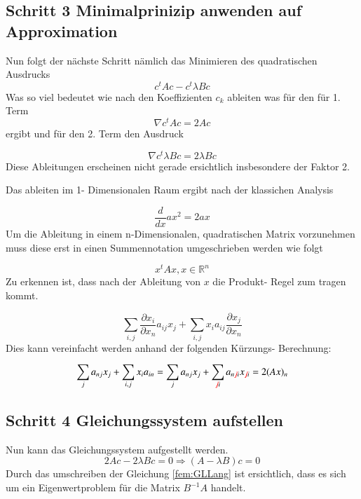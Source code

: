 \subsection{Schritt 3 Minimalprinizip anwenden auf Approximation}

Nun folgt der nächste Schritt nämlich das Minimieren des quadratischen Ausdrucks
\begin{equation}
	c^t Ac - c^t \lambda Bc
\end{equation}
Was so viel bedeutet wie nach den Koeffizienten $c_k$ ableiten was für den  für 1. Term
\begin{equation}
	\nabla c^t Ac = 2Ac
\end{equation}
ergibt und für den 2. Term den Ausdruck

\begin{equation}
	\nabla c^t \lambda Bc = 2\lambda Bc
\end{equation}
Diese Ableitungen erscheinen nicht gerade ersichtlich insbesondere der Faktor 2. 

Das ableiten im 1- Dimensionalen Raum ergibt nach der klassichen Analysis

\begin{equation}
	\frac{d}{dx} ax^2 = 2ax
\end{equation}
Um die Ableitung in einem n-Dimensionalen, quadratischen Matrix vorzunehmen muss diese erst in einen Summennotation umgeschrieben werden wie folgt

\begin{equation}
			x^tAx, x \in \mathbb{R}^n
\end{equation}
Zu erkennen ist, dass nach der Ableitung von $x$ die Produkt- Regel zum tragen kommt. 

\begin{equation}
	\sum_{i,j} \frac{\partial x_i}{\partial x_n} a_{ij} x_j + \sum_{i,j} x_i a_{ij} \frac{\partial x_j}{\partial x_n}
\end{equation}
Dies kann vereinfacht werden anhand der folgenden Kürzungs- Berechnung:

\begin{equation}
	\sum_{j} a_{nj} x_j + \sum_{i,j} x_i a_{in} = \sum_{j} a_{nj} x_j + \sum_{\textcolor{red}{\not{j}} i} a_{n \textcolor{red}{\not{j}} i} x_{\textcolor{red}{\not{j}} i} = 2(Ax)_n
\end{equation}

\subsection{Schritt 4 Gleichungssystem aufstellen}
Nun kann das Gleichungssystem aufgestellt werden.
\begin{equation}
	2Ac - 2\lambda Bc = 0 \Rightarrow (A-\lambda B)c = 0
	\label{fem:GLLang}
\end{equation}
Durch das umschreiben der Gleichung \ref{fem:GLLang} ist ersichtlich, dass es sich um ein Eigenwertproblem für die Matrix $B^{-1}A$ handelt.


